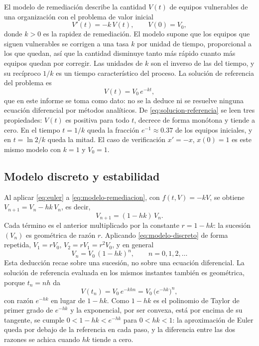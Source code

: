 El modelo de remediación describe la cantidad $V(t)$ de equipos vulnerables de una organización
con el problema de valor inicial
\begin{equation}
  V'(t) = -k\, V(t), \qquad V(0) = V_0 ,
  \label{eq:modelo-remediacion}
\end{equation}
donde $k > 0$ es la rapidez de remediación. El modelo supone que los equipos que siguen
vulnerables se corrigen a una tasa $k$ por unidad de tiempo, proporcional a los que quedan, así
que la cantidad disminuye tanto más rápido cuanto más equipos quedan por corregir. Las unidades de $k$ son el inverso de las del
tiempo, y su recíproco $1/k$ es un tiempo característico del proceso. La solución de referencia
del problema es
\begin{equation}
  V(t) = V_0\, e^{-kt} ,
  \label{eq:solucion-referencia}
\end{equation}
que en este informe se toma como dato: no se la deduce ni se resuelve ninguna ecuación
diferencial por métodos analíticos. De \eqref{eq:solucion-referencia} se leen
tres propiedades: $V(t)$ es positiva para todo $t$, decrece de forma monótona y tiende a cero. En
el tiempo $t = 1/k$ queda la fracción $e^{-1} \approx 0.37$ de los equipos iniciales, y en
$t = \ln 2 / k$ queda la mitad. El caso de verificación $x' = -x$, $x(0) = 1$ es este mismo
modelo con $k = 1$ y $V_0 = 1$.

\subsection{Modelo discreto y estabilidad}
\label{subsec:modelo-discreto}

Al aplicar \eqref{eq:euler} a \eqref{eq:modelo-remediacion}, con $f(t, V) = -kV$, se obtiene
$V_{n+1} = V_n - hk\, V_n$, es decir,
\begin{equation}
  V_{n+1} = (1 - hk)\, V_n .
  \label{eq:modelo-discreto}
\end{equation}
Cada término es el anterior multiplicado por la constante $r = 1 - hk$: la sucesión $(V_n)$ es
geométrica de razón $r$. Aplicando \eqref{eq:modelo-discreto} de forma repetida,
$V_1 = r V_0$, $V_2 = r V_1 = r^2 V_0$, y en general
\begin{equation}
  V_n = V_0\, (1 - hk)^{n}, \qquad n = 0, 1, 2, \ldots
  \label{eq:modelo-discreto-explicito}
\end{equation}
Esta deducción recae sobre una sucesión, no sobre una ecuación diferencial. La solución de referencia evaluada en los mismos instantes también es
geométrica, porque $t_n = nh$ da
\begin{equation}
  V(t_n) = V_0\, e^{-khn} = V_0\, \bigl(e^{-hk}\bigr)^{n} ,
  \label{eq:referencia-discreta}
\end{equation}
con razón $e^{-hk}$ en lugar de $1 - hk$. Como $1 - hk$ es el polinomio de Taylor de primer
grado de $e^{-hk}$ y la exponencial, por ser convexa, está por encima de su tangente, se cumple
$0 < 1 - hk < e^{-hk}$ para $0 < hk < 1$: la aproximación de Euler queda por debajo de la
referencia en cada paso, y la diferencia entre las dos razones se achica cuando $hk$ tiende a
cero.

